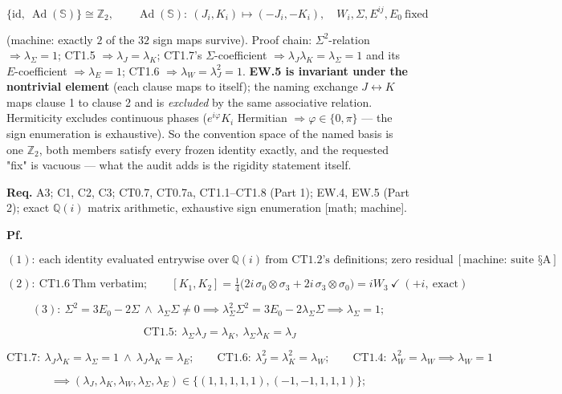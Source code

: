 \begin{theorem}
\[
\{\mathrm{id},\ \operatorname{Ad}(\mathbb S)\}\cong\mathbb Z_2,\qquad \operatorname{Ad}(\mathbb S):\ (J_i,K_i)\mapsto(-J_i,-K_i),\quad W_i,\Sigma,E^{ij},E_0\ \text{fixed}
\]

(machine: exactly $2$ of the $32$ sign maps survive). Proof chain: $\Sigma^2$-relation $\Rightarrow\lambda_\Sigma=1$; CT1.5 $\Rightarrow\lambda_J=\lambda_K$; CT1.7's $\Sigma$-coefficient $\Rightarrow\lambda_J\lambda_K=\lambda_\Sigma=1$ and its $E$-coefficient $\Rightarrow\lambda_E=1$; CT1.6 $\Rightarrow\lambda_W=\lambda_J^2=1$. \textbf{EW.5 is invariant under the nontrivial element} (each clause maps to itself); the naming exchange $J\leftrightarrow K$ maps clause 1 to clause 2 and is \textit{excluded} by the same associative relation. Hermiticity excludes continuous phases ($e^{i\varphi}K_i$ Hermitian $\Rightarrow\varphi\in\{0,\pi\}$ — the sign enumeration is exhaustive). So the convention space of the named basis is one $\mathbb Z_2$, both members satisfy every frozen identity exactly, and the requested "fix" is vacuous — what the audit adds is the rigidity statement itself.

\textbf{Req.} A3; C1, C2, C3; CT0.7, CT0.7a, CT1.1–CT1.8 (Part 1); EW.4, EW.5 (Part 2); exact $\mathbb Q(i)$ matrix arithmetic, exhaustive sign enumeration [math; machine].

\textbf{Pf.}

\[
(1):\ \text{each identity evaluated entrywise over}\ \mathbb Q(i)\ \text{from CT1.2's definitions; zero residual}\ [\text{machine: suite §A}]
\]

\[
(2):\ \mathrm{CT1.6}\ \text{Thm verbatim};\qquad [K_1,K_2]=\tfrac14\bigl(2i\,\sigma_0\otimes\sigma_3+2i\,\sigma_3\otimes\sigma_0\bigr)=iW_3\ \checkmark\ (+i,\ \text{exact})
\]

\[
(3):\ \Sigma^2=3E_0-2\Sigma\ \wedge\ \lambda_\Sigma\Sigma\ne0\implies\lambda_\Sigma^2\Sigma^2=3E_0-2\lambda_\Sigma\Sigma\implies\lambda_\Sigma=1;
\]

\[
\qquad \mathrm{CT1.5}:\ \lambda_\Sigma\lambda_J=\lambda_K,\ \lambda_\Sigma\lambda_K=\lambda_J
\]

\[
\mathrm{CT1.7}:\ \lambda_J\lambda_K=\lambda_\Sigma=1\ \wedge\ \lambda_J\lambda_K=\lambda_E;\qquad \mathrm{CT1.6}:\ \lambda_J^2=\lambda_K^2=\lambda_W;\qquad\mathrm{CT1.4}:\ \lambda_W^2=\lambda_W\implies\lambda_W=1
\]

\[
\implies(\lambda_J,\lambda_K,\lambda_W,\lambda_\Sigma,\lambda_E)\in\{(1,1,1,1,1),(-1,-1,1,1,1)\};
\]


\end{theorem}
